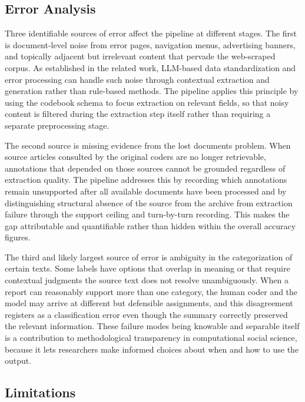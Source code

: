 \documentclass{article}
\begin{document}
\subsection{Error Analysis}\label{error-analysis}


Three identifiable sources of error affect the pipeline at different stages. The first is document-level noise from error pages, navigation menus, advertising banners, and topically adjacent but irrelevant content that pervade the web-scraped corpus. As established in the related work, LLM-based data standardization and error processing can handle such noise through contextual extraction and generation rather than rule-based methods. The pipeline applies this principle by using the codebook schema to focus extraction on relevant fields, so that noisy content is filtered during the extraction step itself rather than requiring a separate preprocessing stage.

The second source is missing evidence from the lost documents problem. When source articles consulted by the original coders are no longer retrievable, annotations that depended on those sources cannot be grounded regardless of extraction quality. The pipeline addresses this by recording which annotations remain unsupported after all available documents have been processed and by distinguishing structural absence of the source from the archive from extraction failure through the support ceiling and turn-by-turn recording. This makes the gap attributable and quantifiable rather than hidden within the overall accuracy figures.

The third and likely largest source of error is ambiguity in the categorization of certain texts. Some labels have options that overlap in meaning or that require contextual judgments the source text does not resolve unambiguously. When a report can reasonably support more than one category, the human coder and the model may arrive at different but defensible assignments, and this disagreement registers as a classification error even though the summary correctly preserved the relevant information. These failure modes being knowable and separable itself is a contribution to methodological transparency in computational social science, because it lets researchers make informed choices about when and how to use the output.

\subsection{Limitations}\label{limitations}
\end{document}
